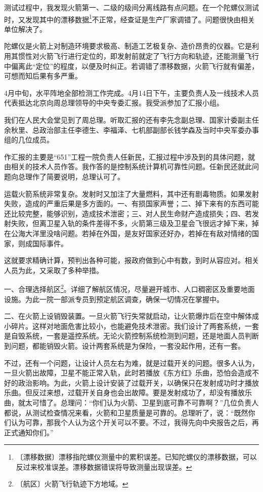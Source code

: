 \documentclass[12pt,UTF-8,openany]{ctexbook}
\begin{document}
\begin{normalsize}
    测试过程中，我发现火箭第一、二级的级间分离线路有点问题。在一个陀螺仪测试时，又发现其中的漂移数据\footnote{〔漂移数据〕漂移指陀螺仪测量中的累积误差。已知陀螺仪的漂移数据，可以反过来校准误差。漂移数据错误将导致测量出现误差。}不正常，经查证是生产厂家调错了。问题很快由相关单位解决了。
    
    陀螺仪是火箭上对制造环境要求极高、制造工艺极复杂、造价昂贵的仪器。它是利用其惯性对火箭飞行进行定位的，即发射前就定了飞行方向和轨迹，还能测量飞行中偏离此“定位”的程度，以便及时纠正。若调错了漂移数据，火箭飞行就有偏差，可想而知后果有多严重。
    
    4月中旬，水平阵地全部检测工作完成。4月14日下午，主要负责人及一线技术人员代表抵达北京向周总理领导的中央专委汇报。我受派参加了汇报小组。
    
    我们在人民大会堂见到了周总理。听取汇报的还有李先念副总理、国家计委副主任余秋里、总政治部主任李德生、李福泽、七机部副部长钱学森及当时中央军委办事组的几位成员。
    
    作汇报的主要是“651”工程一院负责人任新民，汇报过程中涉及到的具体问题，就由相关的技术人员作答。我作答的是控制系统计算机可靠性问题。任新民还就此问题向总理作了简要说明，总理认可了。
    
    运载火箭系统非常复杂。发射时又加注了大量燃料，其中还有剧毒物质。如果发射失败，造成的严重后果是多方面的。一、有损国家声誉；二、掉下来有的东西可能还比较完整，能够识别，造成技术泄密；三、对人民生命财产造成损失；四、若发射失败，但离卫星入轨的条件差得不多，火箭第三级及卫星会飞很远才掉下来，掉在公海大洋里没啥问题。若掉在外国，是友好国家还好办，若掉在有敌对情绪的国家，则成国际事件。
    
    这就要求精确计算，预判出各种可能，报政府做到心中有数，到时从容应对。相关人员为此，又采取了多种举措。
    
    一、合理选择航区\footnote{〔航区〕火箭飞行轨迹下方地域。}。详细了解航区情况，尽量避开城市、人口稠密区及重要地面设施。为此一院一部派专员到预定航区调查，确保一切情况在掌握中。
    
    二、在火箭上设销毁装置。一旦火箭飞行失常就启动，让火箭爆炸后在空中解体成小碎片。这样对地面危害比较小，也能避免技术泄密。我们设计了两套系统，一套是自毁系统，一套是遥控系统。无论火箭控制系统检测到问题，还是地面人员判断到问题，都能销毁火箭。设计两套系统是为保险，一套没起作用，还有一套。
    
    不过，还有一个问题，让设计人员左右为难，就是过载开关的问题。很多人认为，一旦火箭出故障，卫星不能正常入轨，此时若播放《东方红》乐曲，恐怕会造成不好的政治影响。为此，火箭上设计安装了过载开关，以确保只在发射成功时才播放乐曲。但反过来想，过载开关自身也会出故障。要是发射成功了，却没有播放乐曲，就太可惜了。总理问：“你们认为火箭、卫星到底可靠不可靠啊？”几位负责人都说，从测试检查情况来看，火箭和卫星质量是可靠的。总理听了，说：“既然你们认为可靠，那我个人认为这个开关可以不要。不过，我得先向中央报告之后，再正式通知你们。”
    

\end{normalsize}
\end{document}
